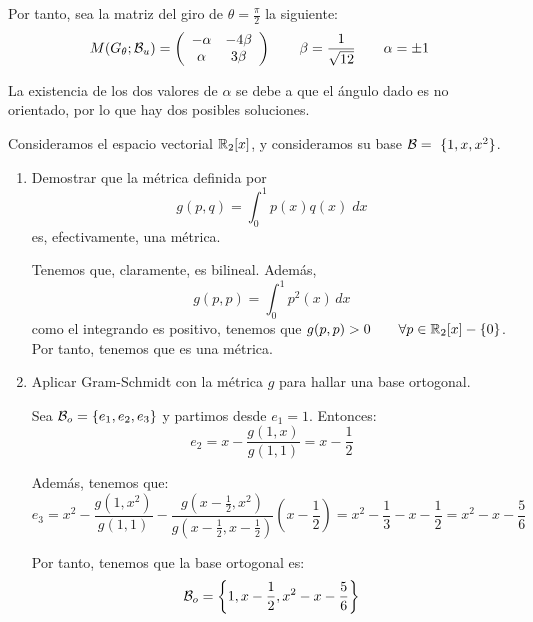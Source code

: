 \begin{ejercicio}
    Por tanto, sea la matriz del giro de $\theta = \frac{\pi}{2}$ la siguiente:
    \begin{equation*}
        M(G_\theta;\mathcal{B}_u) = \left(\begin{array}{cc}
            -\alpha & -4\beta \\
            \alpha & 3\beta
        \end{array}\right) \qquad \beta = \frac{1}{\sqrt{12}} \qquad \alpha = \pm 1
    \end{equation*}

    La existencia de los dos valores de $\alpha$ se debe a que el ángulo dado es no orientado, por lo que hay dos posibles soluciones.
\end{ejercicio}



\begin{ejercicio}
    Consideramos el espacio vectorial $\mathbb{R}_2[x]$, y consideramos su base $\mathcal{B}=~\{1,x,x^2\}$.
    \begin{enumerate}
        \item Demostrar que la métrica definida por
        \begin{equation*}
            g(p,q) = \int_0^1 p(x)q(x)\;dx
        \end{equation*}
        es, efectivamente, una métrica.

        Tenemos que, claramente, es bilineal. Además,
        \begin{equation*}
            g(p,p)=\int_0^1 p^2(x)\,dx
        \end{equation*}
        como el integrando es positivo, tenemos que $g(p,p)>0\qquad \forall p\in \mathbb{R}_2[x]-\{0\}$. Por tanto, tenemos que es una métrica.


        \item Aplicar Gram-Schmidt con la métrica $g$ para hallar una base ortogonal.

        Sea $\mathcal{B}_o = \{e_1, e_2, e_3\}$ y partimos desde $e_1 = 1$. Entonces:
        \begin{equation*}
            e_2 = x - \frac{g(1,x)}{g(1,1)} = x-\frac{1}{2}
        \end{equation*}

        Además, tenemos que:
        \begin{equation*}
            e_3 = x^2 - \frac{g(1,x^2)}{g(1,1)} - \frac{g\left(x-\frac{1}{2},x^2\right)}{g\left( x-\frac{1}{2}, x-\frac{1}{2}\right)}\left(x-\frac{1}{2}\right) = x^2-\frac{1}{3} - x-\frac{1}{2} = x^2 -x -\frac{5}{6}
        \end{equation*}

        Por tanto, tenemos que la base ortogonal es:
        \begin{equation*}
            \mathcal{B}_o = \left\{1, x-\frac{1}{2}, x^2-x-\frac{5}{6}\right\}
        \end{equation*}
    \end{enumerate}
\end{ejercicio}


